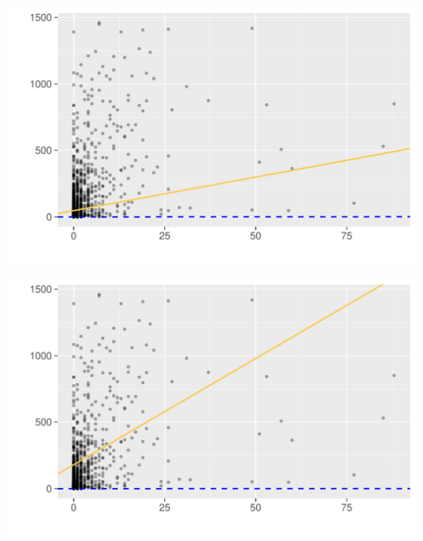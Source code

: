 \begin{minipage}{.5\textwidth}
	\centering
	\includegraphics[page=1,scale=0.3]{../hypotheses/lm_issues_model_9_10.pdf}
  \label{fig:hyp1_issue_model_9-10}
\end{minipage}
\begin{minipage}{.5\textwidth}
	\centering
	\includegraphics[page=1,scale=0.3]{../hypotheses/lm_issues_model_11_12.pdf}
  \label{fig:hyp1_issue_model_11-12}
\end{minipage}

\vspace{20 pt}

